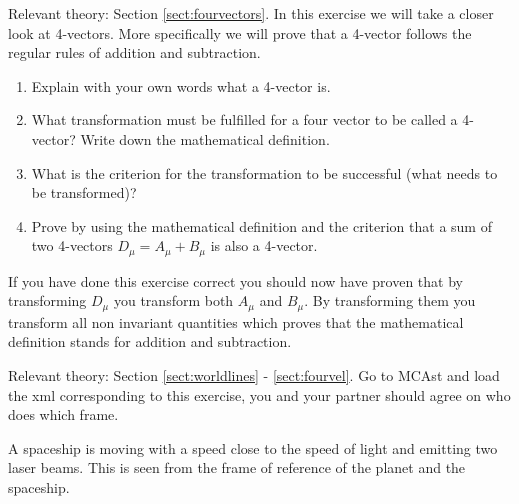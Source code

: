 {\begin{multicols}{2}
\vspace{0.5cm}



Relevant theory: Section \ref{sect:fourvectors}.\newline
In this exercise we will take a closer look at 4-vectors. More specifically we will prove that a 4-vector follows the regular rules of addition and subtraction.
\begin{enumerate}
\item Explain with your own words what a 4-vector is.
\item What transformation must be fulfilled for a four vector to be called a 4-vector? Write down the mathematical definition.
\item What is the criterion for the transformation to be successful (what needs to be transformed)?
\item Prove by using the mathematical definition and the criterion that a sum of two 4-vectors $D_\mu=A_\mu+B_\mu$ is also a 4-vector.
\end{enumerate}
If you have done this exercise correct you should now have proven that by transforming $D_\mu$ you transform both $A_\mu$ and $B_\mu$. By transforming them you transform all non invariant quantities which proves that the mathematical definition stands for addition and subtraction. 


\vspace{0.5cm}



Relevant theory: Section \ref{sect:worldlines} - \ref{sect:fourvel}.\newline
Go to MCAst and load the xml corresponding to this exercise, you and your partner should agree on who does which frame. 

A spaceship is moving with a speed close to the speed of light and emitting two laser beams. This is seen from the frame of reference of the planet and the spaceship.


\end{multicols}}
